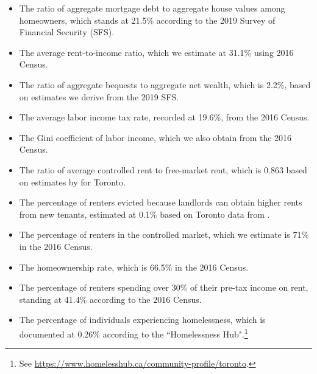 \documentclass[parskip=full]{article}
\begin{document}
\begin{itemize}
    \item The ratio of aggregate mortgage debt to aggregate house values among homeowners, which stands at 21.5\% according to the 2019 Survey of Financial Security (SFS).
    \item The average rent-to-income ratio, which we estimate at 31.1\% using 2016 Census.
    \item The ratio of aggregate bequests to aggregate net wealth, which is 2.2\%, based on estimates we derive from the 2019 SFS.
    \item The average labor income tax rate, recorded at 19.6\%, from the 2016 Census.
    \item The Gini coefficient of labor income, which we also obtain from the 2016 Census.
    \item The ratio of average controlled rent to free-market rent, which is 0.863 based on estimates by \citet{zhang-gou} for Toronto.
    \item The percentage of renters evicted because landlords can obtain higher rents from new tenants, estimated at 0.1\% based on Toronto data from \citet{LeonIveniuk2020}.
    \item The percentage of renters in the controlled market, which we estimate is 71\% in the 2016 Census.
    \item The homeownership rate, which is 66.5\% in the 2016 Census.
    \item The percentage of renters spending over 30\% of their pre-tax income on rent, standing at 41.4\% according to the 2016 Census.
    \item The percentage of individuals experiencing homelessness, which is documented at 0.26\% according to the ``Homelessness Hub".\footnote{See \url{https://www.homelesshub.ca/community-profile/toronto}.}
\end{itemize}
\end{document}
